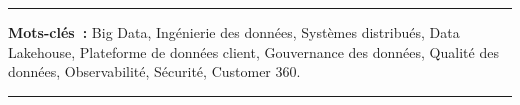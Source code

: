 \vspace{0.18cm}
\noindent\rule{\textwidth}{0.4pt}

\vspace{0.08cm}
{\fontsize{9}{10.2}\selectfont\noindent\textbf{Mots-cl\'es~: }Big Data, Ing\'enierie des donn\'ees, Syst\`emes distribu\'es, Data Lakehouse, Plateforme de donn\'ees client, Gouvernance des donn\'ees, Qualit\'e des donn\'ees, Observabilit\'e, S\'ecurit\'e, Customer 360.\par}

\vspace{0.08cm}
\noindent\rule{\textwidth}{0.4pt}

\endgroup

\clearpage
